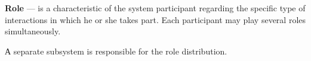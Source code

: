 \textbf{Role} --- is a characteristic of the system participant regarding the specific type of interactions in which he or she takes part. Each participant may play several roles simultaneously.



\begin{note}
  А separate subsystem is responsible for the role distribution.
\end{note}







%
%
%








